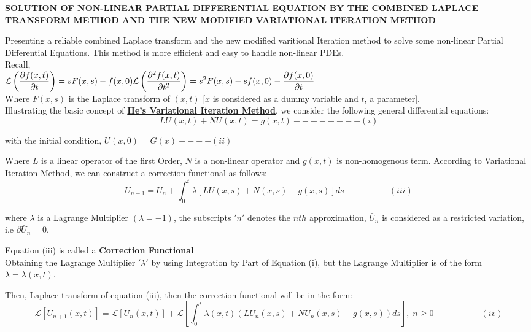 \documentclass[a4paper 11pt]{article}
\newcommand{\Laplace}{\mathcal{L}}
\newcommand{\Un}[2]{U_{#1}(#2)}
\newcommand{\NI}{\noindent}
\newcommand{\LT}[1]{\Laplace \left[#1\right]}
\newcommand{\LTb}[1]{\Laplace \left(#1\right)}
\begin{document}
\newpage
\begin{center}
\bfseries
SOLUTION OF NON-LINEAR PARTIAL DIFFERENTIAL EQUATION BY THE COMBINED LAPLACE TRANSFORM METHOD AND THE NEW MODIFIED VARIATIONAL ITERATION METHOD
\end{center}

\NI Presenting a reliable combined Laplace transform and the new modified varitional Iteration method to solve some non-linear Partial Differential Equations. This method is more efficient and easy to handle non-linear PDEs.\\

\NI Recall, \\[0.2cm]
$\displaystyle \LTb{\frac{\partial f(x,t)}{\partial t}} = sF(x,s) - f(x,0) \\[0.2cm]
\LTb{\frac{\partial^2 f(x,t)}{\partial t^2}} = s^2 F(x,s) - sf(x,0) - \frac{\partial f(x,0)}{\partial t}
$\\[0.2cm]

\NI Where $F(x,s)$ is the Laplace transform of $(x,t)$ [$x$ is considered as a dummy variable and $t$, a parameter].\\[0.2cm]

\NI Illustrating the basic concept of \underline{\textbf{He's Variational Iteration Method}}, we consider the following general differential equations:\\
$$
L\Un{}{x,t} + N\Un{}{x,t} = g(x,t) - - - - - - - - (i)
$$
\begin{center}
with the initial condition, $\Un{}{x,0} = G(x) - - - - (ii)$
\end{center}

\NI Where $L$ is a linear operator of the first Order, $N$ is a non-linear operator and $g(x,t)$ is non-homogenous term. According to Variational  Iteration Method, we can construct a correction functional as follows: 
$$
U_{n+1} = U_n + \int_{0}^{t} \lambda \left[ LU(x,s) + N(x,s) - g(x,s) \right] ds - - - - - (iii)
$$

\NI where $\lambda$ is a Lagrange Multiplier $(\lambda = -1)$, the subscripts $'n'$ denotes the $nth$ approximation, $\bar{U}_n$ is considered as a restricted variation, i.e $\partial\bar{U}_n = 0$.

\NI Equation (iii) is called a \textbf{Correction Functional}\\
Obtaining the Lagrange Multiplier $'\lambda'$ by using Integration by Part of Equation (i), but the Lagrange Multiplier is of the form $\lambda = \lambda(x,t)$.

\NI Then, Laplace transform of equation (iii), then the correction functional will be in the form:\\[0.25cm]
$$
\LT{\Un{n+1}{x,t}} = \LT{\Un{n}{x,t}} + \LT{\int_{0}^{t}\lambda(x,t)\left( L\Un{n}{x,s} + N\Un{n}{x,s} - g(x,s) \right)ds}, \; n \geq 0 \; - - - - - (iv)
$$
\end{document}
